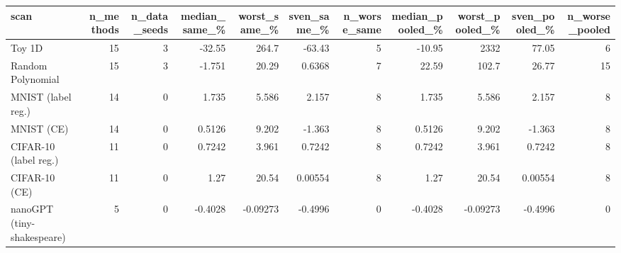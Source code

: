 \begin{tabular}{lrrrrrrrrrr}
\toprule
scan & n\_methods & n\_data\_seeds & median\_same\_\% & worst\_same\_\% & sven\_same\_\% & n\_worse\_same & median\_pooled\_\% & worst\_pooled\_\% & sven\_pooled\_\% & n\_worse\_pooled \\
\midrule
Toy 1D & 15 & 3 & -32.55 & 264.7 & -63.43 & 5 & -10.95 & 2332 & 77.05 & 6 \\
Random Polynomial & 15 & 3 & -1.751 & 20.29 & 0.6368 & 7 & 22.59 & 102.7 & 26.77 & 15 \\
MNIST (label reg.) & 14 & 0 & 1.735 & 5.586 & 2.157 & 8 & 1.735 & 5.586 & 2.157 & 8 \\
MNIST (CE) & 14 & 0 & 0.5126 & 9.202 & -1.363 & 8 & 0.5126 & 9.202 & -1.363 & 8 \\
CIFAR-10 (label reg.) & 11 & 0 & 0.7242 & 3.961 & 0.7242 & 8 & 0.7242 & 3.961 & 0.7242 & 8 \\
CIFAR-10 (CE) & 11 & 0 & 1.27 & 20.54 & 0.00554 & 8 & 1.27 & 20.54 & 0.00554 & 8 \\
nanoGPT (tiny-shakespeare) & 5 & 0 & -0.4028 & -0.09273 & -0.4996 & 0 & -0.4028 & -0.09273 & -0.4996 & 0 \\
\bottomrule
\end{tabular}
